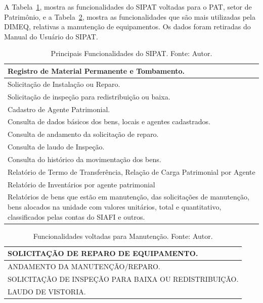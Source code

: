 A Tabela~\ref{sipat1}, mostra as funcionalidades do SIPAT voltadas para o PAT, setor de Patrimônio, e a Tabela~\ref{sipat2}, mostra as funcionalidades que são mais utilizadas pela DIMEQ, relativas a manutenção de equipamentos. Os dados foram retiradas do Manual do Usuário do SIPAT. 


\begin{table}[H]
\centering
\caption{Principais Funcionalidades do SIPAT. Fonte: Autor.}
\label{sipat1}
\begin{tabular}{ | p{15cm} |}
\hline
	Registro de Material Permanente e Tombamento. \\ \hline
	Solicitação de Instalação ou Reparo. \\ \hline
	Solicitação de inspeção para redistribuição ou baixa. \\ \hline
	Cadastro de Agente Patrimonial. \\ \hline
	Consulta de dados básicos dos bens, locais e agentes cadastrados. \\ \hline
	Consulta de andamento da solicitação de reparo. \\ \hline
	Consulta de laudo de Inspeção. \\ \hline
	Consulta do histórico da movimentação dos bens. \\ \hline
	Relatório de Termo de Transferência, Relação de Carga Patrimonial por Agente \\ \hline
	Relatório de Inventários por agente patrimonial \\ \hline
	Relatórios de bens que estão em manutenção, das solicitações de manutenção, bens alocados na unidade com valores unitários, total e quantitativo, classificados pelas contas do SIAFI e outros. \\ \hline
\end{tabular}
\end{table}

\begin{table}[H]
\centering
\caption{Funcionalidades voltadas para Manutenção. Fonte: Autor.}
\label{sipat2}
\begin{tabular}{ | p{15cm} |}
\hline
	SOLICITAÇÃO DE REPARO DE EQUIPAMENTO. \\ \hline
	ANDAMENTO DA MANUTENÇÃO/REPARO. \\ \hline
	SOLICITAÇÃO DE INSPEÇÃO PARA BAIXA OU REDISTRIBUIÇÃO. \\ \hline
	LAUDO DE VISTORIA.\\ \hline
\end{tabular}
\end{table}



